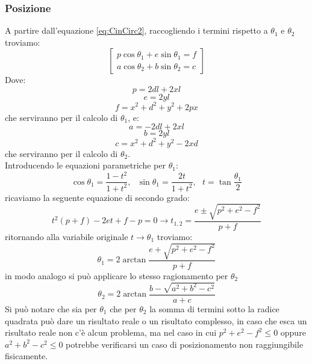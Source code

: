 \subsubsection{Posizione}
A partire dall'equazione \ref{eq:CinCirc2}, raccogliendo i termini rispetto a $\theta_1$ e $\theta_2$ troviamo:
\begin{equation*}
	\begin{bmatrix}
	p\cos\theta_1 +e\sin\theta_1 = f \\
	a\cos\theta_2 +b\sin\theta_2 = c
	\end{bmatrix}
\end{equation*}
Dove:
\begin{equation*}
    p = 2dl + 2xl
\end{equation*}
\begin{equation*}
	e = 2yl
\end{equation*}
\begin{equation*}
	f = x^2+d^2+y^2+2px
\end{equation*}
che serviranno per il calcolo di $\theta_1$, e:
\begin{equation*}
 a = -2dl+2xl
\end{equation*}
\begin{equation*}
	b = 2yl
\end{equation*}
\begin{equation*}
	c = x^2+d^2+y^2-2xd
\end{equation*}
che serviranno per il calcolo di $\theta_2$. 
\\Introducendo le equazioni parametriche per $\theta_1$:
\begin{equation*}
	\cos\theta_1 = \frac{1-t^2}{1+t^2}, \ \ \ \sin\theta_1 = \frac{2t}{1+t^2}, \ \ \ t =\tan \frac{\theta_1}{2}
\end{equation*}
ricaviamo la seguente equazione di secondo grado:
\begin{equation*}
	t^2(p+f) - 2et+f-p = 0\rightarrow t_{1,2} = \frac{e \pm \sqrt{p^2+e^2-f^2}}{p+f}
\end{equation*}
ritornando alla variabile originale $t\rightarrow \theta_1$ troviamo:
\begin{equation}
    \theta_1 = 2\arctan\frac{e+\sqrt{p^2+e^2-f^2}}{p+f}
\end{equation}
in modo analogo si può applicare lo stesso ragionamento per $\theta_2$                         
\begin{equation}
    \theta_2 = 2\arctan\frac{b-\sqrt{a^2+b^2-c^2}}{a+c}
\end{equation}
Si può notare che sia per $\theta_1$ che per $\theta_2$ la somma di termini sotto la radice quadrata può dare un risultato reale o un risultato complesso, in caso che esca un risultato reale non c'è alcun problema, ma nel caso in cui $p^2 + e^2 -f^2 \le 0$ oppure $a^2 + b^2 -c^2 \le 0$ potrebbe verificarsi un caso di posizionamento non raggiungibile fisicamente.
